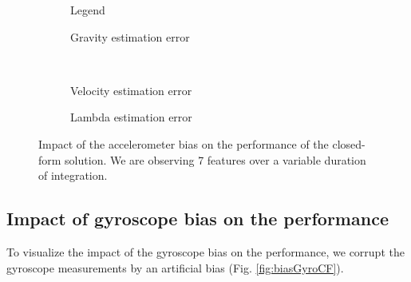 \documentclass[letterpaper, 10 pt, journal, twoside]{IEEEtran}  %
\begin{document}
\begin{figure}
  \centering
        \hspace{0.2\columnwidth}%
        \begin{subfigure}[b]{0.3\columnwidth}
                \resizebox{\columnwidth}{!}{}
                \caption{Legend}

        \end{subfigure}%
        \begin{subfigure}[b]{0.5\columnwidth}
                \resizebox{\columnwidth}{!}{}
                \caption{Gravity estimation error}

        \end{subfigure}
        ~
        \begin{subfigure}[b]{0.5\columnwidth}
                \resizebox{\columnwidth}{!}{}
                \caption{Velocity estimation error}

        \end{subfigure}%
        \begin{subfigure}[b]{0.5\columnwidth}
                \resizebox{\columnwidth}{!}{}
                \caption{Lambda estimation error}

        \end{subfigure}
        \caption{Impact of the accelerometer bias on the performance of the closed-form solution. We are observing 7 features  over a variable duration of integration.\label{fig:biasAccCF}}
\end{figure}



\subsection{Impact of gyroscope bias on the performance}
To visualize the impact of the gyroscope bias on the performance,
we corrupt the gyroscope measurements by an artificial bias (Fig. \ref{fig:biasGyroCF}).

\end{document}
